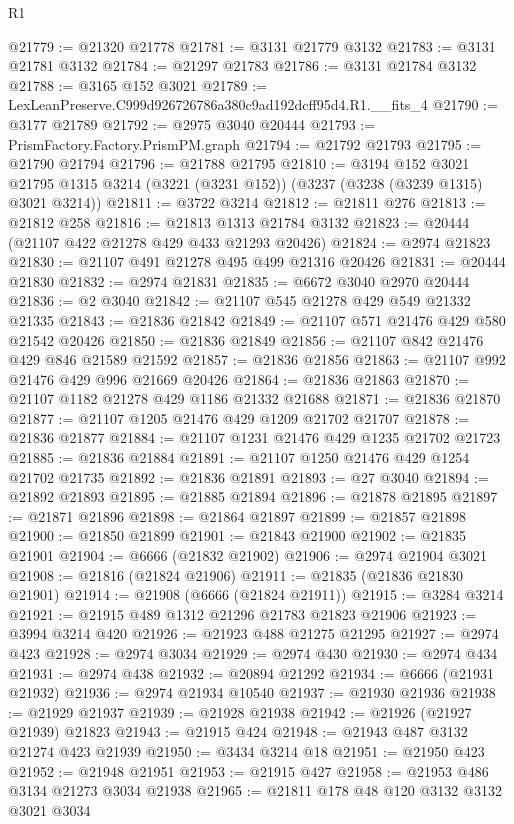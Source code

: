 \begin{lexlean}{R1}
\begin{coremodule}
@21779 := @21320 @21778
@21781 := @3131 @21779 @3132
@21783 := @3131 @21781 @3132
@21784 := @21297 @21783
@21786 := @3131 @21784 @3132
@21788 := @3165 @152 @3021
@21789 := LexLeanPreserve.C999d926726786a380c9ad192dcff95d4.R1.__fits_4
@21790 := @3177 @21789
@21792 := @2975 @3040 @20444
@21793 := PrismFactory.Factory.PrismPM.graph
@21794 := @21792 @21793
@21795 := @21790 @21794
@21796 := @21788 @21795
@21810 := @3194
    @152
    @3021
    @21795
    @1315
    @3214
    (@3221 (@3231 @152))
    (@3237 (@3238 (@3239 @1315) @3021 @3214))
@21811 := @3722 @3214
@21812 := @21811 @276
@21813 := @21812 @258
@21816 := @21813 @1313 @21784 @3132
@21823 := @20444 (@21107 @422 @21278 @429 @433 @21293 @20426)
@21824 := @2974 @21823
@21830 := @21107 @491 @21278 @495 @499 @21316 @20426
@21831 := @20444 @21830
@21832 := @2974 @21831
@21835 := @6672 @3040 @2970 @20444
@21836 := @2 @3040
@21842 := @21107 @545 @21278 @429 @549 @21332 @21335
@21843 := @21836 @21842
@21849 := @21107 @571 @21476 @429 @580 @21542 @20426
@21850 := @21836 @21849
@21856 := @21107 @842 @21476 @429 @846 @21589 @21592
@21857 := @21836 @21856
@21863 := @21107 @992 @21476 @429 @996 @21669 @20426
@21864 := @21836 @21863
@21870 := @21107 @1182 @21278 @429 @1186 @21332 @21688
@21871 := @21836 @21870
@21877 := @21107 @1205 @21476 @429 @1209 @21702 @21707
@21878 := @21836 @21877
@21884 := @21107 @1231 @21476 @429 @1235 @21702 @21723
@21885 := @21836 @21884
@21891 := @21107 @1250 @21476 @429 @1254 @21702 @21735
@21892 := @21836 @21891
@21893 := @27 @3040
@21894 := @21892 @21893
@21895 := @21885 @21894
@21896 := @21878 @21895
@21897 := @21871 @21896
@21898 := @21864 @21897
@21899 := @21857 @21898
@21900 := @21850 @21899
@21901 := @21843 @21900
@21902 := @21835 @21901
@21904 := @6666 (@21832 @21902)
@21906 := @2974 @21904 @3021
@21908 := @21816 (@21824 @21906)
@21911 := @21835 (@21836 @21830 @21901)
@21914 := @21908 (@6666 (@21824 @21911))
@21915 := @3284 @3214
@21921 := @21915 @489 @1312 @21296 @21783 @21823 @21906
@21923 := @3994 @3214 @420
@21926 := @21923 @488 @21275 @21295
@21927 := @2974 @423
@21928 := @2974 @3034
@21929 := @2974 @430
@21930 := @2974 @434
@21931 := @2974 @438
@21932 := @20894 @21292
@21934 := @6666 (@21931 @21932)
@21936 := @2974 @21934 @10540
@21937 := @21930 @21936
@21938 := @21929 @21937
@21939 := @21928 @21938
@21942 := @21926 (@21927 @21939) @21823
@21943 := @21915 @424
@21948 := @21943 @487 @3132 @21274 @423 @21939
@21950 := @3434 @3214 @18
@21951 := @21950 @423
@21952 := @21948 @21951
@21953 := @21915 @427
@21958 := @21953 @486 @3134 @21273 @3034 @21938
@21965 := @21811 @178 @48 @120 @3132 @3132 @3021 @3034

\end{coremodule}
\end{lexlean}

